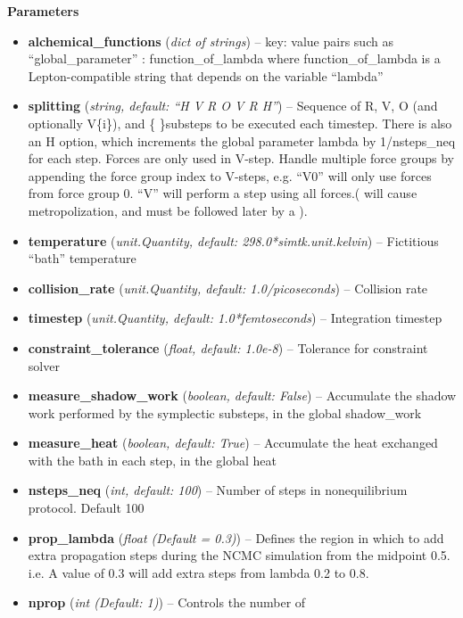 \begin{description}
\begin{description}
\item
    \textbf{Parameters}
\begin{itemize}
\item
  \textbf{alchemical\_functions} (\emph{dict of strings}) -- key: value
  pairs such as ``global\_parameter'' : function\_of\_lambda where
  function\_of\_lambda is a Lepton-compatible string that depends on the
  variable ``lambda''
\item
  \textbf{splitting} (\emph{string, default: ``H V R O V R H''}) --
  Sequence of R, V, O (and optionally V\{i\}), and \{ \}substeps to be
  executed each timestep. There is also an H option, which increments
  the global parameter lambda by 1/nsteps\_neq for each step. Forces are
  only used in V-step. Handle multiple force groups by appending the
  force group index to V-steps, e.g. ``V0'' will only use forces from
  force group 0. ``V'' will perform a step using all forces.( will cause
  metropolization, and must be followed later by a ).
\item
  \textbf{temperature} (\emph{unit.Quantity, default: 298.0*simtk.unit.kelvin}) -- Fictitious ``bath''
  temperature
\item
  \textbf{collision\_rate} (\emph{unit.Quantity, default: 1.0/picoseconds}) -- Collision
  rate
\item
  \textbf{timestep} (\emph{unit.Quantity, default: 1.0*femtoseconds}) -- Integration
  timestep
\item
  \textbf{constraint\_tolerance} (\emph{float, default: 1.0e-8}) --
  Tolerance for constraint solver
\item
  \textbf{measure\_shadow\_work} (\emph{boolean, default: False}) --
  Accumulate the shadow work performed by the symplectic substeps, in
  the global shadow\_work
\item
  \textbf{measure\_heat} (\emph{boolean, default: True}) -- Accumulate
  the heat exchanged with the bath in each step, in the global heat
\item
  \textbf{nsteps\_neq} (\emph{int, default: 100}) -- Number of steps in
  nonequilibrium protocol. Default 100
\item
  \textbf{prop\_lambda} (\emph{float (Default = 0.3)}) -- Defines the
  region in which to add extra propagation steps during the NCMC
  simulation from the midpoint 0.5. i.e. A value of 0.3 will add extra
  steps from lambda 0.2 to 0.8.
\item
  \textbf{nprop} (\emph{int (Default: 1)}) -- Controls the number of

\end{itemize}
\end{description}
\end{description}
